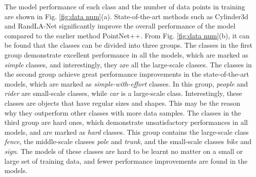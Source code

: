 \documentclass[journal]{IEEEtran}
\begin{document}
The model performance of each class and the number of data points in training are shown in Fig. \ref{fig:data num}(a). State-of-the-art methods such as Cylinder3d and RandLA-Net significantly improve the overall performance of the model compared to the earlier method PointNet++.
From Fig. \ref{fig:data num}(b), it can be found that the classes can be divided into three groups.
The classes in the first group demonstrate excellent performance in all the models, which are marked as {\it simple} classes, and interestingly, they are all the large-scale classes.
The classes in the second group achieve great performance improvements in the state-of-the-art models, which are marked as {\it simple-with-effort} classes. In this group, \textit{people} and \textit{rider} are small-scale classes, while \textit{car} is a large-scale class. Interestingly, these classes are objects that have regular sizes and shapes. This may be the reason why they outperform other classes with more data samples.
The classes in the third group are hard ones, which demonstrate unsatisfactory performances in all models, and are marked as {\it hard} classes. This group contains the large-scale class \textit{fence}, the middle-scale classes \textit{pole} and \textit{trunk}, and the small-scale classes \textit{bike} and \textit{sign}. The models of these classes are hard to be learnt no matter on a small or large set of training data, and fewer performance improvements are found in the models.

%
%
\end{document}
